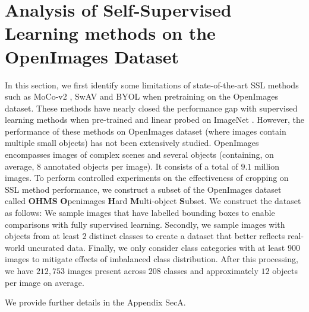 \section{Analysis of Self-Supervised Learning methods on the OpenImages Dataset}

\label{sec:analysis}
In this section, we first identify some limitations of state-of-the-art SSL methods such as MoCo-v2  \cite{he2019momentum,chen2020improved}, SwAV  \cite{NEURIPS2020_70feb62b} and BYOL \cite{grill2020bootstrap} when pretraining on the OpenImages dataset. These methods have nearly closed the performance gap with supervised learning methods when pre-trained and linear probed on ImageNet \cite{imagenet_cvpr09}. However, the performance of these methods on OpenImages dataset (where images contain multiple small objects) has not been extensively studied. OpenImages \cite{kuznetsova2020open} encompasses images of complex scenes and several objects (containing, on average, $8$ annotated objects per image). It consists of a total of $9.1$ million images. To perform controlled experiments on the effectiveness of cropping on SSL method performance, we construct a subset of the OpenImages dataset called \textbf{OHMS} \textbf{O}penimages \textbf{H}ard \textbf{M}ulti-object \textbf{S}ubset. We construct the dataset as follows: We sample images that have labelled bounding boxes to enable comparisons with fully supervised learning. Secondly, we sample images with objects from at least $2$ distinct classes to create a dataset that better reflects real-world uncurated data. Finally,  we only consider class categories with at least 900 images to mitigate effects of imbalanced class distribution. After this processing, we have $212,753$ images present across $208$ classes and approximately $12$ objects per image on average. 

We provide further details in the Appendix SecA.



